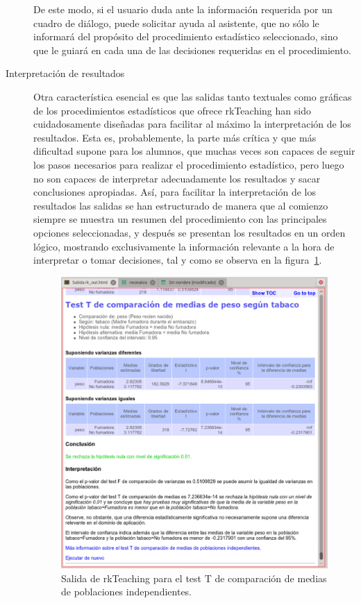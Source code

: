 \documentclass[a4paper,10pt,twoside]{article}
\newcommand{\rkteaching}{\textsf{rkTeaching}}
\begin{document}
\begin{description}
De este modo, si el usuario duda ante la información requerida por un cuadro de diálogo, puede solicitar
ayuda al asistente, que no sólo le informará del propósito del procedimiento estadístico seleccionado, sino que le
guiará en cada una de las decisiones requeridas en el procedimiento.

\item[Interpretación de resultados] Otra característica esencial es que las salidas tanto textuales como gráficas
de los procedimientos estadísticos que ofrece \rkteaching{} han sido cuidadosamente diseñadas para facilitar al máximo
la interpretación de los resultados. 
Esta es, probablemente, la parte más crítica y que más dificultad supone para los alumnos, que muchas veces son
capaces de seguir los pasos necesarios para realizar el procedimiento estadístico, pero luego no son capaces de
interpretar adecuadamente los resultados y sacar conclusiones apropiadas. 
Así, para facilitar la interpretación de los resultados las salidas se han estructurado de manera que al
comienzo siempre se muestra un resumen del procedimiento con las principales opciones seleccionadas, y
después se presentan los resultados en un orden lógico, mostrando exclusivamente la información relevante
a la hora de interpretar o tomar decisiones, tal y como se observa en la figura~\ref{f:salida-test-t}. 

\begin{figure}[htbp!]
\centering
\includegraphics[width=\textwidth]{img/salida_test_t.png}
\caption{Salida de \rkteaching{} para el test T de comparación de medias de poblaciones independientes.}
\label{f:salida-test-t}
\end{figure}


\end{description}
\end{document}
